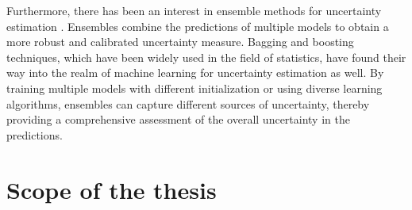Furthermore, there has been an interest in ensemble methods for uncertainty estimation \cite{lakshminarayanan_simple_2017}. Ensembles combine the predictions of multiple models to obtain a more robust and calibrated uncertainty measure. Bagging and boosting techniques, which have been widely used in the field of statistics, have found their way into the realm of machine learning for uncertainty estimation as well. By training multiple models with different initialization or using diverse learning algorithms, ensembles can capture different sources of uncertainty, thereby providing a comprehensive assessment of the overall uncertainty in the predictions.









\section{Scope of the thesis}

